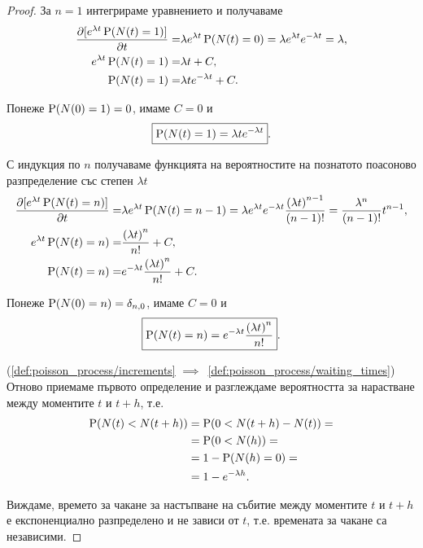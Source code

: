 \documentclass[numbers=endperiod, bibliography=totocnumbered]{scrartcl}
\begin{document}
\begin{proof}
  За \( n = 1 \) интегрираме уравнението и получаваме
  \begin{align*}
    \frac {\partial [e^{\lambda t} \operatorname{P}(N(t) = 1)]} {\partial t}
    =&
    \lambda e^{\lambda t} \operatorname{P}(N(t) = 0)
    =
    \lambda e^{\lambda t} e^{-\lambda t}
    =
    \lambda,
    \\
    e^{\lambda t} \operatorname{P}(N(t) = 1)
    =&
    \lambda t + C,
    \\
    \operatorname{P}(N(t) = 1)
    =&
    \lambda t e^{-\lambda t} + C.
  \end{align*}

  Понеже \( \operatorname{P}(N(0) = 1) = 0 \), имаме \( C = 0 \) и
  \begin{align*}
    \boxed{\operatorname{P}(N(t) = 1) = \lambda t e^{-\lambda t}}.
  \end{align*}

  С индукция по \( n \) получаваме функцията на вероятностите на познатото поасоново разпределение със степен \( \lambda t \)
  \begin{align*}
    \frac {\partial [e^{\lambda t} \operatorname{P}(N(t) = n)]} {\partial t}
    =&
    \lambda e^{\lambda t} \operatorname{P}(N(t) = n - 1)
    =
    \lambda e^{\lambda t} e^{-\lambda t} \frac {{(\lambda t)}^{n-1}} {(n-1)!}
    =
    \frac {\lambda^n} {(n-1)!} t^{n-1},
    \\
    e^{\lambda t} \operatorname{P}(N(t) = n)
    =&
    \frac {{(\lambda t)}^n} {n!} + C,
    \\
    \operatorname{P}(N(t) = n)
    =&
    e^{-\lambda t} \frac {{(\lambda t)}^n} {n!} + C.
  \end{align*}

  Понеже \( \operatorname{P}(N(0) = n) = \delta_{n,0} \), имаме \( C = 0 \) и
  \begin{align*}
    \boxed{\operatorname{P}(N(t) = n) = e^{-\lambda t} \frac {{(\lambda t)}^n} {n!}}.
  \end{align*}

  (\ref{def:poisson_process/increments} \( \implies \)~\ref{def:poisson_process/waiting_times}) Отново приемаме първото определение и разглеждаме вероятността за нарастване между моментите \( t \) и \( t+h \), т.е.
  \begin{align*}
    \operatorname{P}(N(t) < N(t+h))
    &=
    \operatorname{P}(0 < N(t+h) - N(t))
    = \\ &=
    \operatorname{P}(0 < N(h))
    = \\ &=
    1 - \operatorname{P}(N(h) = 0)
    = \\ &=
    1 - e^{-\lambda h}.
  \end{align*}

  Виждаме, времето за чакане за настъпване на събитие между моментите \( t \) и \( t+h \) е експоненциално разпределено и не зависи от \( t \), т.е. времената за чакане са независими.


\end{proof}
\end{document}
